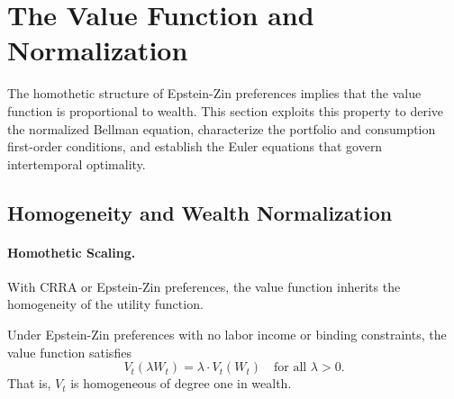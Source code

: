 
\section{The Value Function and Normalization}
\label{sec:value-function}

The homothetic structure of Epstein-Zin preferences implies that the value function is proportional to wealth. This section exploits this property to derive the normalized Bellman equation, characterize the portfolio and consumption first-order conditions, and establish the Euler equations that govern intertemporal optimality.

\subsection{Homogeneity and Wealth Normalization}
\label{subsec:homogeneity-normalization}

\paragraph{Homothetic Scaling.}

With CRRA or Epstein-Zin preferences, the value function inherits the homogeneity of the utility function.

\begin{proposition}
\label{prop:homogeneity}
Under Epstein-Zin preferences with no labor income or binding constraints, the value function satisfies
\begin{equation}
V_t(\lambda W_t) = \lambda \cdot V_t(W_t) \quad \text{for all } \lambda > 0.
\label{eq:homogeneity}
\end{equation}
That is, $V_t$ is homogeneous of degree one in wealth.
\end{proposition}

